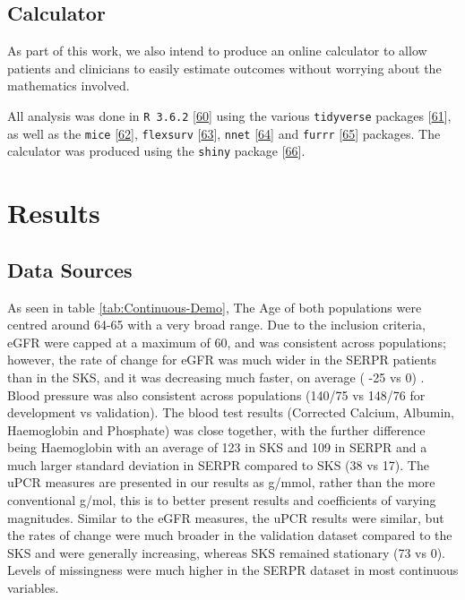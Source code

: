 \documentclass[
]{article}
\begin{document}
\hypertarget{calculator}{%
\subsection{Calculator}\label{calculator}}

As part of this work, we also intend to produce an online calculator to allow patients and clinicians to easily estimate outcomes without worrying about the mathematics involved.

All analysis was done in \texttt{R\ 3.6.2} {[}\protect\hyperlink{ref-r_core_team_r_nodate}{60}{]} using the various \texttt{tidyverse} packages {[}\protect\hyperlink{ref-wickham_tidy_2017}{61}{]}, as well as the \texttt{mice} {[}\protect\hyperlink{ref-buuren_mice_2011-1}{62}{]}, \texttt{flexsurv} {[}\protect\hyperlink{ref-jackson_flexsurv_nodate}{63}{]}, \texttt{nnet} {[}\protect\hyperlink{ref-ripley_package_2016}{64}{]} and \texttt{furrr} {[}\protect\hyperlink{ref-vaughan_furrr_2018}{65}{]} packages. The calculator was produced using the \texttt{shiny} package {[}\protect\hyperlink{ref-chang_shiny_2020}{66}{]}.

\hypertarget{results-1}{%
\section{Results}\label{results-1}}

\hypertarget{data-sources-1}{%
\subsection{Data Sources}\label{data-sources-1}}

As seen in table \ref{tab:Continuous-Demo}, The Age of both populations were centred around 64-65 with a very broad range. Due to the inclusion criteria, eGFR were capped at a maximum of 60, and was consistent across populations; however, the rate of change for eGFR was much wider in the SERPR patients than in the SKS, and it was decreasing much faster, on average ( -25 vs 0) . Blood pressure was also consistent across populations (140/75 vs 148/76 for development vs validation). The blood test results (Corrected Calcium, Albumin, Haemoglobin and Phosphate) was close together, with the further difference being Haemoglobin with an average of 123 in SKS and 109 in SERPR and a much larger standard deviation in SERPR compared to SKS (38 vs 17). The uPCR measures are presented in our results as g/mmol, rather than the more conventional g/mol, this is to better present results and coefficients of varying magnitudes. Similar to the eGFR measures, the uPCR results were similar, but the rates of change were much broader in the validation dataset compared to the SKS and were generally increasing, whereas SKS remained stationary (73 vs 0). Levels of missingness were much higher in the SERPR dataset in most continuous variables.
\end{document}

